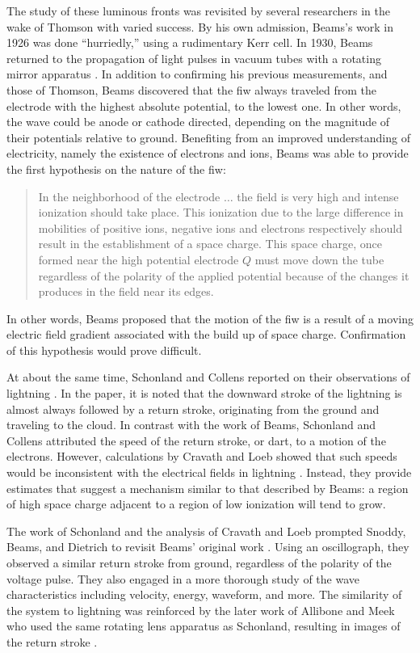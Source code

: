The study of these luminous fronts was revisited by several researchers in the
wake of Thomson \cite{James1904, Whiddington1925, Beams1926} with varied
success. By his own admission, Beams's work in 1926 was done ``hurriedly,''
using a rudimentary Kerr cell. In 1930, Beams returned to the propagation of
light pulses in vacuum tubes with a rotating mirror apparatus \cite{Beams1930}.
In addition to confirming his previous measurements, and those of Thomson, Beams
discovered that the \acs{fiw} always traveled from the electrode with the
highest absolute potential, to the lowest one. In other words, the wave could be
anode or cathode directed, depending on the magnitude of their potentials
relative to ground. Benefiting from an improved understanding of electricity,
namely the existence of electrons and ions, Beams was able to provide the first
hypothesis on the nature of the \acs{fiw}:
\begin{quote}
  In the neighborhood of the electrode $\ldots{}$ the field is very high and
  intense ionization should take place. This ionization due to the large
  difference in mobilities of positive ions, negative ions and electrons
  respectively should result in the establishment of a space charge. This space
  charge, once formed near the high potential electrode $Q$ must move down the
  tube regardless of the polarity of the applied potential because of the
  changes it produces in the field near its edges.
\end{quote}


In other words, Beams proposed that the motion of the \acs{fiw} is a result of a
moving electric field gradient associated with the build up of space charge.
Confirmation of this hypothesis would prove difficult.

At about the same time, Schonland and Collens reported on their observations of
lightning \cite{Schonland1933}. In the paper, it is noted that the downward
stroke of the lightning is almost always followed by a return stroke,
originating from the ground and traveling to the cloud. In contrast with the
work of Beams, Schonland and Collens attributed the speed of the return stroke,
or dart, to a motion of the electrons. However, calculations by Cravath and Loeb
showed that such speeds would be inconsistent with the electrical fields in
lightning \cite{Cravath1935}. Instead, they provide estimates that suggest a
mechanism similar to that described by Beams: a region of high space charge
adjacent to a region of low ionization will tend to grow.

The work of Schonland and the analysis of Cravath and Loeb prompted Snoddy,
Beams, and Dietrich to revisit Beams' original work \cite{Snoddy1936}. Using an
oscillograph, they observed a similar return stroke from ground, regardless of
the polarity of the voltage pulse. They also engaged in a more thorough
study of the wave characteristics including velocity, energy, waveform, and
more. The similarity of the system to lightning was reinforced by the later work
of Allibone and Meek who used the same rotating lens apparatus as Schonland,
resulting in images of the return stroke \cite{Allibone1938}.

